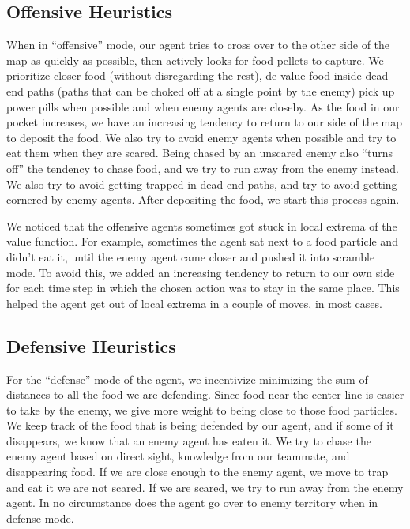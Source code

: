 \documentclass[a4paper,12pt]{article}
\begin{document}
\subsection{Offensive Heuristics}
\label{subsec:offensive_heuristics}
When in ``offensive'' mode, our agent tries to cross over to the other side of the map as quickly as possible, then actively looks for food pellets to capture. We prioritize closer food (without disregarding the rest), de-value food inside dead-end paths (paths that can be choked off at a single point by the enemy) pick up power pills when possible and when enemy agents are closeby. As the food in our pocket increases, we have an increasing tendency to return to our side of the map to deposit the food. We also try to avoid enemy agents when possible and try to eat them when they are scared. Being chased by an unscared enemy also ``turns off'' the tendency to chase food, and we try to run away from the enemy instead. We also try to avoid getting trapped in dead-end paths, and try to avoid getting cornered by enemy agents. After depositing the food, we start this process again.

We noticed that the offensive agents sometimes got stuck in local extrema of the value function. For example, sometimes the agent sat next to a food particle and didn't eat it, until the enemy agent came closer and pushed it into scramble mode. To avoid this, we added an increasing tendency to return to our own side for each time step in which the chosen action was to stay in the same place. This helped the agent get out of local extrema in a couple of moves, in most cases.

\subsection{Defensive Heuristics}
\label{subsec:defensive_heuristics}

For the ``defense'' mode of the agent, we incentivize minimizing the sum of distances to all the food we are defending. Since food near the center line is easier to take by the enemy, we give more weight to being close to those food particles. We keep track of the food that is being defended by our agent, and if some of it disappears, we know that an enemy agent has eaten it. We try to chase the enemy agent based on direct sight, knowledge from our teammate, and disappearing food. If we are close enough to the enemy agent, we move to trap and eat it we are not scared. If we are scared, we try to run away from the enemy agent. In no circumstance does the agent go over to enemy territory when in defense mode.
\end{document}
